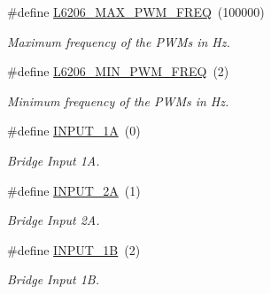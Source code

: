 \begin{DoxyCompactItemize}
\#define \mbox{\hyperlink{group___l6206___private___constants_ga978d83ef1e5b8d4652aaa54d2ca0b61d}{L6206\+\_\+\+M\+A\+X\+\_\+\+P\+W\+M\+\_\+\+F\+R\+EQ}}~(100000)
\begin{DoxyCompactList}\small\item\em Maximum frequency of the P\+W\+Ms in Hz. \end{DoxyCompactList}\item 
\mbox{\label{group___l6206___private___constants_ga6803e169f0b455746626516553becd34}} 
\#define \mbox{\hyperlink{group___l6206___private___constants_ga6803e169f0b455746626516553becd34}{L6206\+\_\+\+M\+I\+N\+\_\+\+P\+W\+M\+\_\+\+F\+R\+EQ}}~(2)
\begin{DoxyCompactList}\small\item\em Minimum frequency of the P\+W\+Ms in Hz. \end{DoxyCompactList}\item 
\mbox{\label{group___l6206___private___constants_ga7011235a914d9abe0dbab7791c193271}} 
\#define \mbox{\hyperlink{group___l6206___private___constants_ga7011235a914d9abe0dbab7791c193271}{I\+N\+P\+U\+T\+\_\+1A}}~(0)
\begin{DoxyCompactList}\small\item\em Bridge Input 1A. \end{DoxyCompactList}\item 
\mbox{\label{group___l6206___private___constants_gaf282b97c7e019453751550dbef80824e}} 
\#define \mbox{\hyperlink{group___l6206___private___constants_gaf282b97c7e019453751550dbef80824e}{I\+N\+P\+U\+T\+\_\+2A}}~(1)
\begin{DoxyCompactList}\small\item\em Bridge Input 2A. \end{DoxyCompactList}\item 
\mbox{\label{group___l6206___private___constants_gae7d0d09a0ab0c71ba3698e1e1f4bf0c6}} 
\#define \mbox{\hyperlink{group___l6206___private___constants_gae7d0d09a0ab0c71ba3698e1e1f4bf0c6}{I\+N\+P\+U\+T\+\_\+1B}}~(2)
\begin{DoxyCompactList}\small\item\em Bridge Input 1B. \end{DoxyCompactList}\item 

\end{DoxyCompactItemize}
